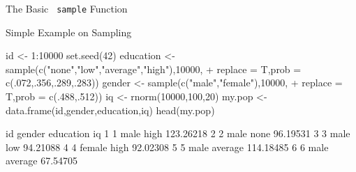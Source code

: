 \documentclass[11pt,german,hideothersubsections]{beamer}
\newcommand{\R}[1]{{\tt \color{blue}  #1}}
\begin{document}
\begin{frame}[fragile]{The Basic \R{sample} Function}
\begin{center}



\end{center}
\end{frame}
\begin{frame}[fragile]{Simple Example on Sampling}
\begin{footnotesize}
\begin{Schunk}
\begin{Sinput}
 id <- 1:10000
 set.seed(42)
 education <- sample(c("none","low","average","high"),10000, 
+                     replace = T,prob = c(.072,.356,.289,.283))
 gender <- sample(c("male","female"),10000,
+                  replace = T,prob = c(.488,.512))
 iq <- rnorm(10000,100,20)
 my.pop <- data.frame(id,gender,education,iq)
 head(my.pop)
\end{Sinput}
\begin{Soutput}
  id gender education        iq
1  1   male      high 123.26218
2  2   male      none  96.19531
3  3   male       low  94.21088
4  4 female      high  92.02308
5  5   male   average 114.18485
6  6   male   average  67.54705
\end{Soutput}
\end{Schunk}
\end{footnotesize}
\end{frame}
\end{document}
